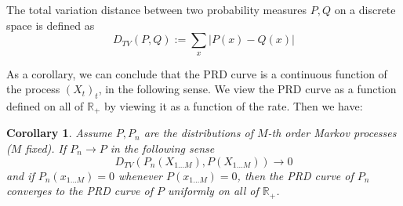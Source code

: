 \documentclass[11pt,letterpaper]{article}
\newcommand{\E}[0]{\mathbb{E}}
\newcounter{theorem}
\newtheorem{proposition}[theorem]{Proposition}
\newtheorem{corollary}[theorem]{Corollary}
\begin{document}




The total variation distance between two probability measures $P, Q$ on a discrete space is defined as
		$$D_{TV}(P,Q) := \sum_{x} \left|P(x) - Q(x)\right|$$
	

As a corollary, we can conclude that the PRD curve is a continuous function of the process $(X_t)_t$, in the following sense.
We view the PRD curve as a function defined on all of $\mathbb{R}_+$ by viewing it as a function of the rate.
Then we have:






\begin{corollary}
Assume $P, P_n$ are the distributions of $M$-th order Markov processes ($M$ fixed). If $P_n \rightarrow P$ in the following sense
		$$D_{TV}(P_n(X_{1\dots M}), P(X_{1\dots M})) \rightarrow 0$$
and if $P_n(x_{1\dots M}) = 0$ whenever $P(x_{1\dots M}) = 0$,
then the PRD curve of $P_n$ converges to the PRD curve of $P$ uniformly on all of $\mathbb{R}_+$.

\end{corollary}
\end{document}

